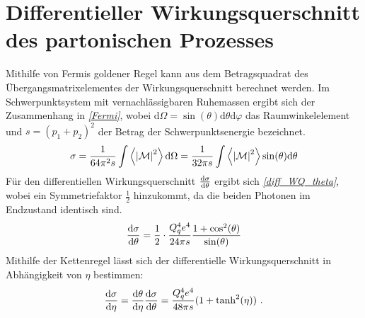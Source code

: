 \section{Differentieller Wirkungsquerschnitt des partonischen Prozesses}
\label{2.2}
Mithilfe von Fermis goldener Regel kann aus dem Betragsquadrat des Übergangsmatrixelementes der Wirkungsquerschnitt berechnet werden.
Im Schwerpunktsystem mit vernachlässigbaren Ruhemassen ergibt sich der Zusammenhang in \textit{\autoref{Fermi}}, wobei $\text{d}\Omega = \sin(\theta)\text{d}\theta\text{d}\varphi$ das Raumwinkelelement und $s = (p_1 + p_2)^2$ der Betrag der Schwerpunktsenergie bezeichnet.
\begin{equation}
\sigma = \frac{1}{64\pi^2s} \int \left\langle  \abs{\mathcal{M}}^2\right\rangle \text{d}\Omega = \frac{1}{32\pi s} \int \left\langle  \abs{\mathcal{M}}^2\right\rangle \sin(\theta) \text{d}\theta
\label{Fermi}
\end{equation}
Für den differentiellen Wirkungsquerschnitt $\derivative{\sigma}{\theta}$ ergibt sich \textit{\autoref{diff_WQ_theta}}, wobei ein Symmetriefaktor $\frac{1}{2}$ hinzukommt, da die beiden Photonen im Endzustand identisch sind.
\begin{equation}
\derivative{\sigma}{\theta} = \frac{1}{2} \cdot \frac{Q_q^4e^4}{24\pi s}\frac{1+\cos^2(\theta)}{\sin(\theta)} 
\label{diff_WQ_theta}
\end{equation}
Mithilfe der Kettenregel lässt sich der differentielle Wirkungsquerschnitt in Abhängigkeit von $\eta$ bestimmen:
\begin{equation}
\derivative{\sigma}{\eta} =\derivative{\theta}{\eta}\derivative{\sigma}{\theta} =  \frac{Q_q^4e^4}{48\pi s}(1+\tanh^2(\eta))~.
\label{diff_WQ_eta}
\end{equation}
